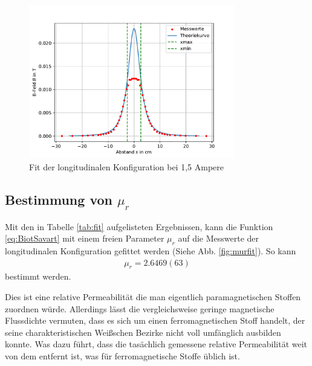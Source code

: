 \documentclass[11pt, a4paper]{article}
\begin{document}
    \begin{figure}
        \centering
        \includegraphics[width=0.8\textwidth]{fit15a.pdf}
        \caption{Fit der longitudinalen Konfiguration bei 1,5 Ampere}
        \label{fig:longfit15a}
    \end{figure}

    \subsection{Bestimmung von $\mu_r$}
    Mit den in Tabelle \ref{tab:fit} aufgelisteten Ergebnissen, kann die Funktion \ref{eq:BiotSavart} mit einem freien Parameter $\mu_r$ auf die Messwerte der longitudinalen Konfiguration gefittet werden (Siehe Abb. \ref{fig:murfit}). So kann 
    \begin{align}
        \mu_r = 2.6469(63)
    \end{align} bestimmt werden.
    
    Dies ist eine relative Permeabilität die man eigentlich paramagnetischen Stoffen zuordnen würde. Allerdings lässt die vergleichsweise geringe magnetische Flussdichte vermuten, dass es sich um einen ferromagnetischen Stoff handelt, der seine charakteristischen Weißschen Bezirke nicht voll umfänglich ausbilden konnte.
    Was dazu führt, dass die tasächlich gemessene relative Permeabilität weit von dem entfernt ist, was für ferromagnetische Stoffe üblich ist.
    
\end{document}
